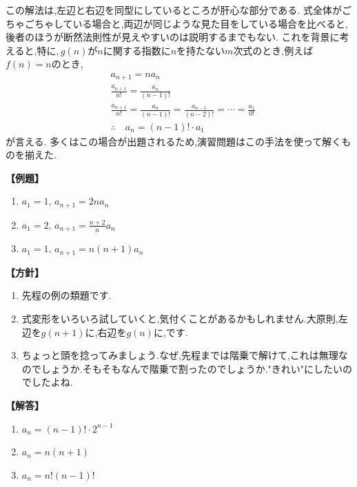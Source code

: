      この解法は,左辺と右辺を同型にしているところが肝心な部分である.
      式全体がごちゃごちゃしている場合と,両辺が同じような見た目をしている場合を比べると,後者のほうが断然法則性が見えやすいのは説明するまでもない.
      これを背景に考えると,特に,\,$g(n)$が$n$に関する指数に$n$を持たない$m$次式のとき,例えば$f(n)=n$のとき,
      \begin{align*}
        &a_{n+1}=na_n\\
        &\frac{a_{n+1}}{n!}=\frac{a_n}{(n-1)!}\\
        &\frac{a_{n+1}}{n!}=\frac{a_n}{(n-1)!}=\frac{a_{n-1}}{(n-2)!}=\cdots=\frac{a_1}{0!}\\
        &\therefore \quad a_n=(n-1)!\cdot a_1
      \end{align*}
      が言える.
      多くはこの場合が出題されるため,演習問題はこの手法を使って解くものを揃えた.
      
      \noindent \textbf{【例題】}
      \begin{enumerate}[label=(\arabic*),parsep=3pt]
        \item $\displaystyle a_1=1,\, a_{n+1}=2na_n$
        \item $\displaystyle a_1=2,\, a_{n+1}=\frac{n+2}{n}a_n$
        \item $\displaystyle a_1=1,\, a_{n+1}=n(n+1)a_n$
      \end{enumerate}

      \noindent\textbf{【方針】}
      \begin{enumerate}[label=(\arabic*),parsep=3pt]
        \item 先程の例の類題です.
        \item 式変形をいろいろ試していくと,気付くことがあるかもしれません.大原則,左辺を$g(n+1)$に,右辺を$g(n)$に,です.
        \item ちょっと頭を捻ってみましょう.なぜ,先程までは階乗で解けて,これは無理なのでしょうか.そもそもなんで階乗で割ったのでしょうか."きれい"にしたいのでしたよね.
      \end{enumerate}

      \noindent\textbf{【解答】}
      \begin{enumerate}[label=(\arabic*),parsep=3pt]
        \item $\displaystyle a_n=(n-1)!\cdot 2^{n-1}$
        \item $\displaystyle a_n=n(n+1)$
        \item $\displaystyle a_n=n!(n-1)!$
      \end{enumerate}

